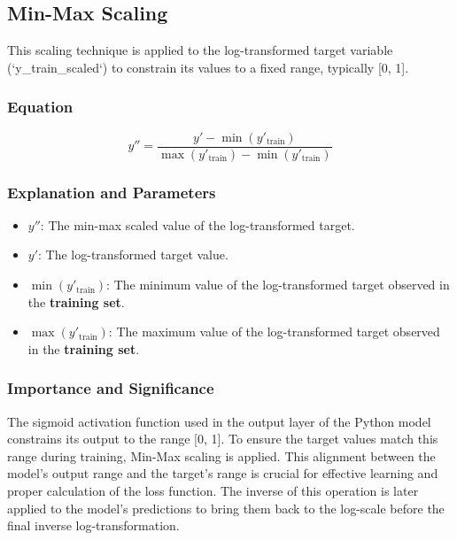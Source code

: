 \documentclass[12pt, a4paper]{article}
\begin{document}
\subsection{Min-Max Scaling}
This scaling technique is applied to the log-transformed target variable (`y\_train\_scaled`) to constrain its values to a fixed range, typically [0, 1].

\subsubsection{Equation}
\begin{equation}
y'' = \frac{y' - \min(y'_{\text{train}})}{\max(y'_{\text{train}}) - \min(y'_{\text{train}})}
\label{eq:minmax}
\end{equation}

\subsubsection{Explanation and Parameters}
\begin{itemize}
    \item \textbf{$y''$}: The min-max scaled value of the log-transformed target.
    \item \textbf{$y'$}: The log-transformed target value.
    \item \textbf{$\min(y'_{\text{train}})$}: The minimum value of the log-transformed target observed in the \textbf{training set}.
    \item \textbf{$\max(y'_{\text{train}})$}: The maximum value of the log-transformed target observed in the \textbf{training set}.
\end{itemize}

\subsubsection{Importance and Significance}
The sigmoid activation function used in the output layer of the Python model constrains its output to the range [0, 1]. To ensure the target values match this range during training, Min-Max scaling is applied. This alignment between the model's output range and the target's range is crucial for effective learning and proper calculation of the loss function. The inverse of this operation is later applied to the model's predictions to bring them back to the log-scale before the final inverse log-transformation.

\newpage
\end{document}
